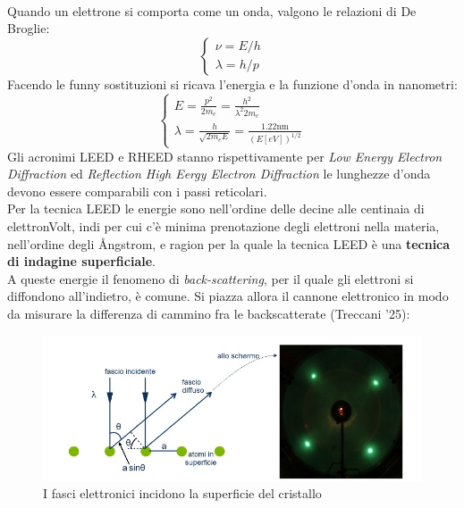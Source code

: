 \documentclass{book}
\begin{document}
        \paragraph{}
            Quando un elettrone si comporta come un onda, valgono le relazioni di De Broglie:
            $$\begin{cases}
                \nu = E/h \\
                \lambda = h/p
            \end{cases}$$
        Facendo le funny sostituzioni si ricava l'energia e la funzione d'onda in nanometri:
        $$\begin{cases}
            E = \displaystyle \frac{p^{2}}{2m_{e}} = \frac{h^{2}}{\lambda ^{2}2m_{e}} \\
            \lambda = \displaystyle \frac{h}{\sqrt{2m_{e}E}} = \frac{1.22 \textrm{nm}}{(E[eV])^{1/2}}
        \end{cases}$$
        Gli acronimi LEED e RHEED stanno rispettivamente per \textit{Low Energy Electron Diffraction} ed \textit{Reflection High Eergy Electron Diffraction} le lunghezze d'onda devono essere comparabili con i passi reticolari.\\
        Per la tecnica LEED le energie sono nell'ordine delle decine alle centinaia di elettronVolt, indi per cui c'è minima prenotazione degli elettroni nella materia, nell'ordine degli \si{\angstrom}ngstrom, e ragion per la quale la tecnica LEED è una \textbf{tecnica di indagine superficiale}.\\
        A queste energie il fenomeno di \textit{back-scattering}, per il quale gli elettroni si diffondono all'indietro, è comune. Si piazza allora il cannone elettronico in modo da misurare la differenza di cammino fra le backscatterate (Treccani '25):
        \begin{figure}
            \centering
            \includegraphics[width=0.5\linewidth]{img/LEED2.png}
            \caption{I fasci elettronici incidono la superficie del cristallo}
            \label{fig:enter-label}
        \end{figure}
\end{document}
